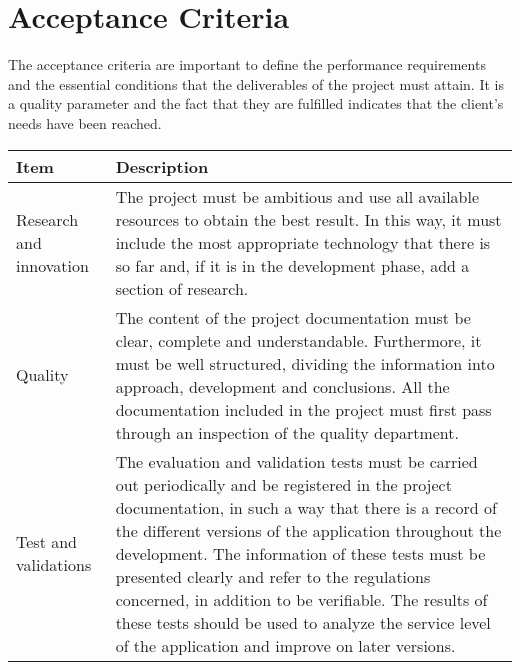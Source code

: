 \section{Acceptance Criteria}

The acceptance criteria are important to define the performance requirements and the essential conditions that the deliverables of the project must attain. It is a quality parameter and the fact that they are fulfilled indicates that the client's needs have been reached.

\begin{longtable}[H]{ p{4cm} p{10.1cm} }
	
	\toprule[2pt]
	
	\textbf{Item} & \textbf{Description} \\ 
	
	\midrule[1.5pt] \endhead
	
	Research and innovation & The project must be ambitious and use all available resources to obtain the best result. In this way, it must include the most appropriate technology that there is so far and, if it is in the development phase, add a section of research. \vspace{0.2cm}
	\\ \midrule
	
	Quality & The content of the project documentation must be clear, complete and understandable. Furthermore, it must be well structured, dividing the information into approach, development and conclusions. 
	\newline
	All the documentation included in the project must first pass through an inspection of the quality department. \vspace{0.2cm}
	\\ \midrule
	
	Test and validations & The evaluation and validation tests must be carried out periodically and be registered in the project documentation, in such a way that there is a record of the different versions of the application throughout the development. 
	\newline
	The information of these tests must be presented clearly and refer to the regulations concerned, in addition to be verifiable. 
	\newline
	The results of these tests should be used to analyze the service level of the application and improve on later versions. \vspace{0.2cm}
	\\ \midrule
	

\end{longtable}
